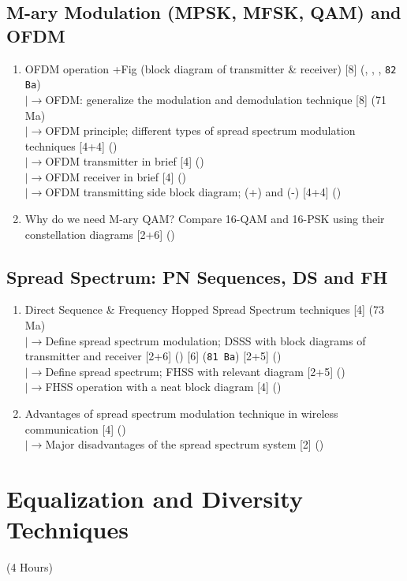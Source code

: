 \documentclass[12pt]{article}
\newcommand{\lb}{\\$\left|\rightarrow\right.$}
\begin{document}
  \subsection{M-ary Modulation (MPSK, MFSK, QAM) and OFDM}
    \begin{enumerate}[topsep=0pt, noitemsep]
      \item OFDM operation +Fig (block diagram of transmitter \& receiver)
        \hfill [8] (, , , \texttt{82 Ba})
        \lb OFDM: generalize the modulation and demodulation technique \hfill [8] (71 Ma)
        \lb OFDM principle; different types of spread spectrum modulation techniques \hfill [4+4] ()
        \lb OFDM transmitter in brief \hfill [4] ()
        \lb OFDM receiver in brief \hfill [4] ()
        \lb OFDM transmitting side block diagram; (+) and (-) \hfill [4+4] ()
      \item Why do we need M-ary QAM? Compare 16-QAM and 16-PSK using their
        constellation diagrams \hfill [2+6] ()
    \end{enumerate}

  \subsection{Spread Spectrum: PN Sequences, DS and FH}
    \begin{enumerate}[topsep=0pt, noitemsep]
      \item Direct Sequence \& Frequency Hopped Spread Spectrum techniques \hfill [4] (73 Ma)
        \lb Define spread spectrum modulation; DSSS with block diagrams of transmitter
        and receiver \hfill [2+6] () [6] (\texttt{81 Ba}) [2+5] ()
        \lb Define spread spectrum; FHSS with relevant diagram \hfill [2+5] ()
        \lb FHSS operation with a neat block diagram \hfill [4] ()
      \item Advantages of spread spectrum modulation technique in wireless communication \hfill [4] ()
        \lb Major disadvantages of the spread spectrum system \hfill [2] ()
    \end{enumerate}

\pagebreak
\section{Equalization and Diversity Techniques}
\begin{center}(4 Hours)\end{center}
\end{document}
